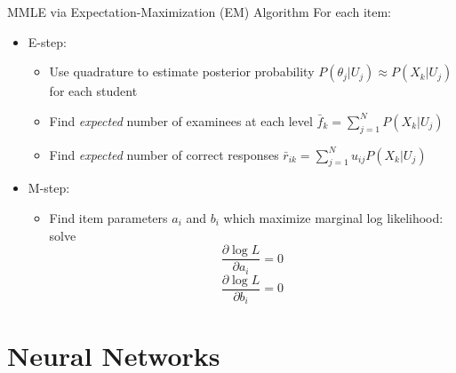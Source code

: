 \documentclass{beamer}
\theoremstyle{definition}
\begin{document}
\begin{frame}{MMLE via Expectation-Maximization (EM) Algorithm}
For each item:
\begin{itemize}
  \item E-step: 
  \begin{itemize}
    \item<2-> Use quadrature to estimate posterior probability $P(\theta_j| U_j) \approx P(X_k | U_j)$ for each student
    \item<3-> Find \textit{expected} number of examinees at each level $\bar f_{k} = \sum_{j=1}^N P(X_k| U_j)$
    \item<3-> Find \textit{expected} number of correct responses $\bar r_{ik} = \sum_{j=1}^N u_{ij} P(X_k| U_j)$
  \end{itemize}
  \item<4-> M-step:
  \begin{itemize}
    \item<5-> Find item parameters $a_i$ and $b_i$ which maximize marginal log likelihood: solve
    \[\frac{\partial \log L}{\partial a_i} = 0\]
    \[\frac{\partial \log L}{\partial b_i} = 0\]
  \end{itemize}
\end{itemize}
\end{frame}




\section{Neural Networks}

\end{document}
